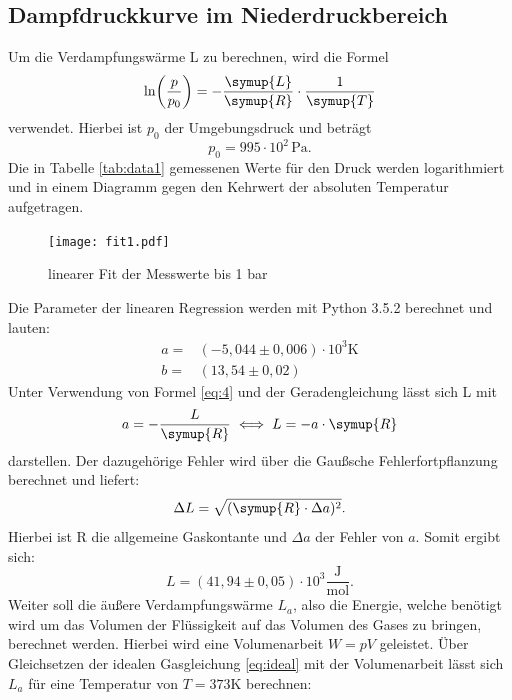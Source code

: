 \subsection{Dampfdruckkurve im Niederdruckbereich}
Um die Verdampfungswärme L zu berechnen, wird die Formel
\begin{equation*}
  \ln \biggl(\frac{p}{p_0}\biggr)=-\frac{\symup{L}}{\symup{R}} \cdot \frac{1}{\symup{T}}
\end{equation*}
verwendet. Hierbei ist $p_0$ der Umgebungsdruck und beträgt
\begin{equation*}
  p_0=995\cdot 10^2 \,\si{\pascal}.
\end{equation*}
Die in Tabelle \ref{tab:data1} gemessenen Werte für den Druck werden logarithmiert und in einem
Diagramm gegen den Kehrwert der absoluten Temperatur aufgetragen.

\begin{figure}[H]
  \centering
  \texttt{[image: fit1.pdf]}
  \caption{linearer Fit der Messwerte bis 1 bar}
  \label{fig:fit1}
  \end{figure}
Die Parameter der linearen Regression werden mit Python 3.5.2 berechnet und
lauten:
\begin{align*}
  a =& (-5,044 \pm 0,006) \cdot 10^3 \si{\kelvin} \\
  b =& (13,54 \pm 0,02)
\end{align*}
Unter Verwendung von Formel \eqref{eq:4} und der Geradengleichung
lässt sich L mit
\begin{equation}
  a=-\frac{L}{\symup{R}} \iff L = -a \cdot \symup{R}
\end{equation}
darstellen. Der dazugehörige Fehler wird über die Gaußsche Fehlerfortpflanzung
berechnet und liefert:
\begin{equation}
  \Delta L = \sqrt{(\symup{R} \cdot \Delta a)^2}.
  \label{eqn:fehler}
\end{equation}
Hierbei ist R die allgemeine Gaskontante und $\Delta a$ der Fehler von $a$.
Somit ergibt sich:
\begin{equation*}
  L=(41,94 \pm 0,05)\cdot 10^3 \frac{\si{\joule}}{\si{\mol}}.
\end{equation*}
Weiter soll die äußere Verdampfungswärme $L_a$, also die Energie, welche
benötigt wird um das Volumen der Flüssigkeit auf das Volumen des Gases
zu bringen, berechnet werden. Hierbei wird eine Volumenarbeit $W=pV$ geleistet.
Über Gleichsetzen der idealen Gasgleichung \eqref{eq:ideal} mit der
Volumenarbeit lässt sich $L_a$ für eine Temperatur von $T=373 \si{\kelvin}$
berechnen:
